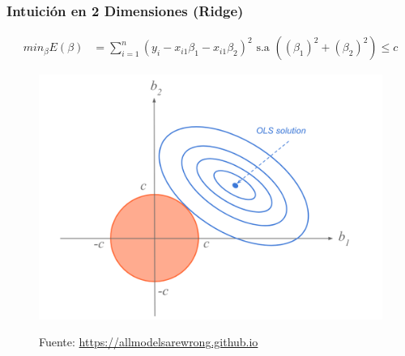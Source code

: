 \documentclass[
  shownotes,
  xcolor={svgnames},
  hyperref={colorlinks,citecolor=DarkBlue,linkcolor=DarkRed,urlcolor=DarkBlue}
  , aspectratio=169]{beamer}
\begin{document}
\begin{frame}[fragile]
\frametitle{Intuición en 2 Dimensiones (Ridge)}

\begin{align}
     min_{\beta} E(\beta) &= \sum_{i=1}^n (y_i - x_{i1}\beta_1 - x_{i1}\beta_2)^2  \text{ s.a }   \left( (\beta_1)^2 + (\beta_2)^2 \right) \leq c 
  \end{align}

\begin{figure}[H] \centering
            \captionsetup{justification=centering}
              \includegraphics[scale=0.3]{figures/ridge3}
 
\tiny
Fuente: \url{https://allmodelsarewrong.github.io}
\end{figure}


\end{frame}
\end{document}

